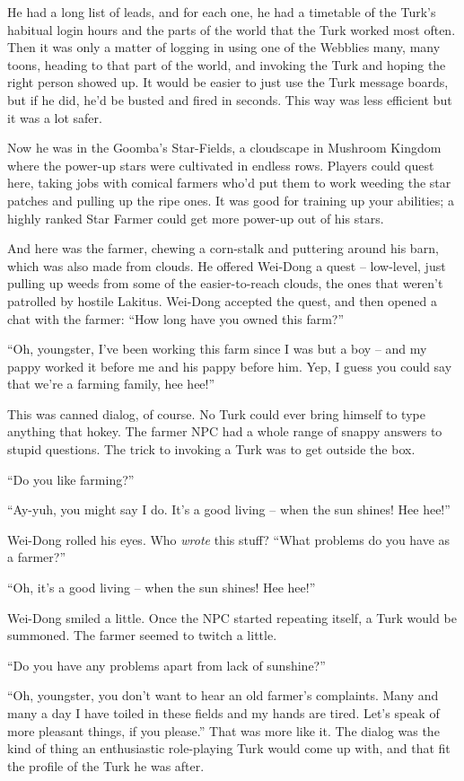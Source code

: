 He had a long list of leads, and for each one, he had a timetable
of the Turk's habitual login hours and the parts of the world that
the Turk worked most often. Then it was only a matter of logging in
using one of the Webblies many, many toons, heading to that part of
the world, and invoking the Turk and hoping the right person showed
up. It would be easier to just use the Turk message boards, but if
he did, he'd be busted and fired in seconds. This way was less
efficient but it was a lot safer.

Now he was in the Goomba's Star-Fields, a cloudscape in Mushroom
Kingdom where the power-up stars were cultivated in endless rows.
Players could quest here, taking jobs with comical farmers who'd
put them to work weeding the star patches and pulling up the ripe
ones. It was good for training up your abilities; a highly ranked
Star Farmer could get more power-up out of his stars.

And here was the farmer, chewing a corn-stalk and puttering around
his barn, which was also made from clouds. He offered Wei-Dong a
quest -- low-level, just pulling up weeds from some of the
easier-to-reach clouds, the ones that weren't patrolled by hostile
Lakitus. Wei-Dong accepted the quest, and then opened a chat with
the farmer: ``How long have you owned this farm?''

``Oh, youngster, I've been working this farm since I was but a boy
-- and my pappy worked it before me and his pappy before him. Yep,
I guess you could say that we're a farming family, hee hee!''

This was canned dialog, of course. No Turk could ever bring himself
to type anything that hokey. The farmer NPC had a whole range of
snappy answers to stupid questions. The trick to invoking a Turk
was to get outside the box.

``Do you like farming?''

``Ay-yuh, you might say I do. It's a good living -- when the sun
shines! Hee hee!''

Wei-Dong rolled his eyes. Who \emph{wrote} this stuff? ``What
problems do you have as a farmer?''

``Oh, it's a good living -- when the sun shines! Hee hee!''

Wei-Dong smiled a little. Once the NPC started repeating itself, a
Turk would be summoned. The farmer seemed to twitch a little.

``Do you have any problems apart from lack of sunshine?''

``Oh, youngster, you don't want to hear an old farmer's complaints.
Many and many a day I have toiled in these fields and my hands are
tired. Let's speak of more pleasant things, if you please.'' That
was more like it. The dialog was the kind of thing an enthusiastic
role-playing Turk would come up with, and that fit the profile of
the Turk he was after.


